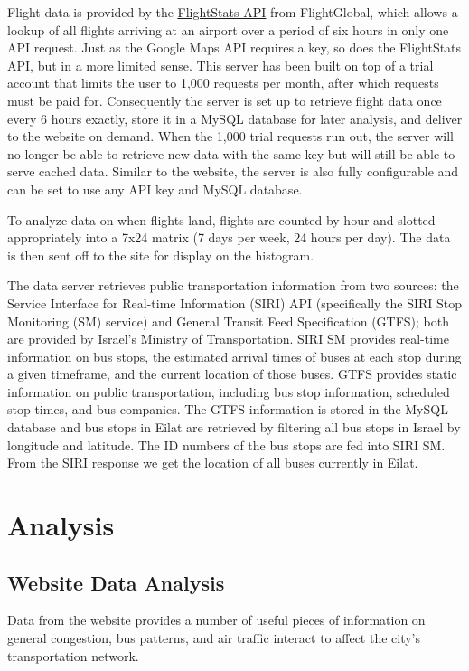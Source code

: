\documentclass[12pt]{article}                       %
\begin{document}
Flight data is provided by the \underline{\href{https://www.flightstats.com/v2/}{FlightStats API}} from FlightGlobal, which allows a lookup of all flights arriving at an airport over a period of six hours in only one API request. Just as the Google Maps API requires a key, so does the FlightStats API, but in a more limited sense. This server has been built on top of a trial account that limits the user to 1,000 requests per month, after which requests must be paid for. Consequently the server is set up to retrieve flight data once every 6 hours exactly, store it in a MySQL database for later analysis, and deliver to the website on demand. When the 1,000 trial requests run out, the server will no longer be able to retrieve new data with the same key but will still be able to serve cached data. Similar to the website, the server is also fully configurable and can be set to use any API key and MySQL database.

To analyze data on when flights land, flights are counted by hour and slotted appropriately into a 7x24 matrix (7 days per week, 24 hours per day). The data is then sent off to the site for display on the histogram.

The data server retrieves public transportation information from two sources: the Service Interface for Real-time Information (SIRI) API (specifically the SIRI Stop Monitoring (SM) service) and General Transit Feed Specification (GTFS); both are provided by Israel's Ministry of Transportation. SIRI SM provides real-time information on bus stops, the estimated arrival times of buses at each stop during a given timeframe, and the current location of those buses. GTFS provides static information on public transportation, including bus stop information, scheduled stop times, and bus companies. The GTFS information is stored in the MySQL database and bus stops in Eilat are retrieved by filtering all bus stops in Israel by longitude and latitude. The ID numbers of the bus stops are fed into SIRI SM. From the SIRI response we get the location of all buses currently in Eilat.

\newpage
\section{Analysis}

\subsection{Website Data Analysis}
Data from the website provides a number of useful pieces of information on general congestion, bus patterns, and air traffic interact to affect the city's transportation network.
\end{document}
